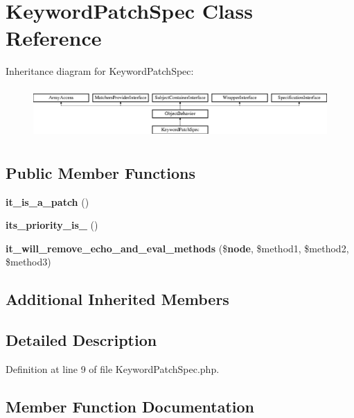 \section{Keyword\+Patch\+Spec Class Reference}
\label{classspec_1_1_prophecy_1_1_doubler_1_1_class_patch_1_1_keyword_patch_spec}
Inheritance diagram for Keyword\+Patch\+Spec\+:\begin{figure}[H]
\begin{center}
\leavevmode
\includegraphics[height=1.953488cm]{classspec_1_1_prophecy_1_1_doubler_1_1_class_patch_1_1_keyword_patch_spec}
\end{center}
\end{figure}
\subsection*{Public Member Functions}
\begin{DoxyCompactItemize}
\item 
{\bf it\+\_\+is\+\_\+a\+\_\+patch} ()
\item 
{\bf its\+\_\+priority\+\_\+is\+\_} ()
\item 
{\bf it\+\_\+will\+\_\+remove\+\_\+echo\+\_\+and\+\_\+eval\+\_\+methods} (\${\bf node}, \$method1, \$method2, \$method3)
\end{DoxyCompactItemize}
\subsection*{Additional Inherited Members}


\subsection{Detailed Description}


Definition at line 9 of file Keyword\+Patch\+Spec.\+php.



\subsection{Member Function Documentation}
